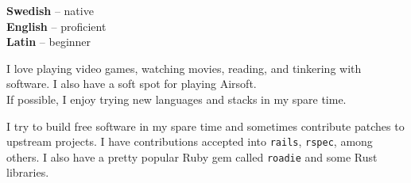 \documentclass[9pt]{template} %
\begin{document}
\begin{minipage}[t]{0.3\textwidth}
  \vspace{-\baselineskip} %


  \textbf{Swedish} -- native\\
  \textbf{English} -- proficient\\
  \textbf{Latin} -- beginner
\end{minipage}
\hfill
\begin{minipage}[t]{0.3\textwidth}
  \vspace{-\baselineskip} %


  I love playing video games, watching movies, reading, and tinkering with
  software. I also have a soft spot for playing Airsoft.\\ If possible, I enjoy
  trying new languages and stacks in my spare time.
\end{minipage}
\hfill
\begin{minipage}[t]{0.3\textwidth}
  \vspace{-\baselineskip} %


  I try to build free software in my spare time and sometimes contribute
  patches to upstream projects. I have contributions accepted into
  \texttt{rails}, \texttt{rspec}, among others. I also have a pretty popular
  Ruby gem called \texttt{roadie} and some Rust libraries.
\end{minipage}


\end{document}
